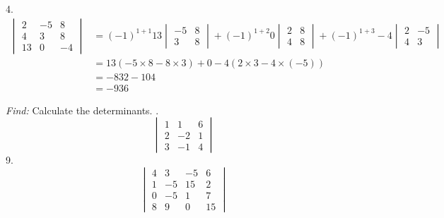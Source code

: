 \documentclass[11pt]{homework}
\begin{document}
4.
\begin{align*}
  \begin{vmatrix}
  2 & -5 & 8 \\
  4 & 3 & 8 \\
  13 & 0 & -4
  \end{vmatrix}
  &=
  (-1)^{1+1}
  13
  \begin{vmatrix}
    -5 & 8 \\
    3 & 8
  \end{vmatrix}
  + (-1)^{1+2}
  0
  \begin{vmatrix}
    2 & 8 \\
    4 & 8
  \end{vmatrix}
  + (-1)^{1+3}
  -4
  \begin{vmatrix}
    2 & -5 \\
    4 & 3
  \end{vmatrix} \\
  &= 
  13 (-5 \times 8 - 8 \times 3)
  + 0
  -4 (2 \times 3 - 4 \times (-5)) \\
  &= -832 - 104 \\
  &= -936
\end{align*}

\newpage
{}
\emph{Find:}
\newline
Calculate the determinants.
.
\begin{equation*}
  \begin{vmatrix}
  1 & 1 & 6 \\
  2 & -2& 1 \\
  3 & -1& 4
  \end{vmatrix}
\end{equation*}
9.
\begin{equation*}
  \begin{vmatrix}
  4 & 3 & -5 & 6 \\
  1 & -5& 15 & 2 \\
  0 & -5& 1  & 7 \\
  8 & 9 & 0  & 15 
  \end{vmatrix}
\end{equation*} 
\end{document}
